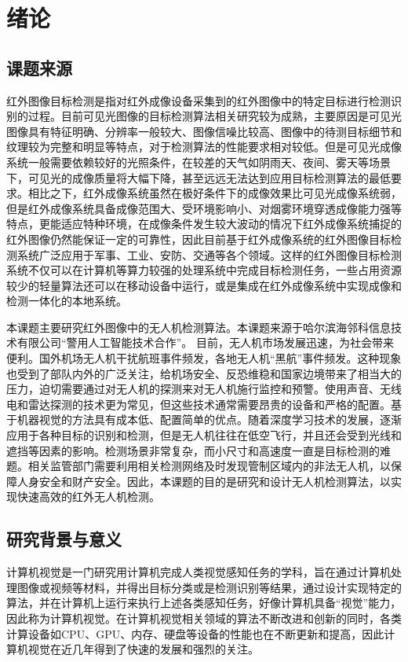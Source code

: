\chapter{绪论}

\section{课题来源}
红外图像目标检测是指对红外成像设备采集到的红外图像中的特定目标进行检测识别的过程。目前可见光图像的目标检测算法相关研究较为成熟，主要原因是可见光图像具有特征明确、分辨率一般较大、图像信噪比较高、图像中的待测目标细节和纹理较为完整和明显等特点，对于检测算法的性能要求相对较低。但是可见光成像系统一般需要依赖较好的光照条件，在较差的天气如阴雨天、夜间、雾天等场景下，可见光的成像质量将大幅下降，甚至远远无法达到应用目标检测算法的最低要求。相比之下，红外成像系统虽然在极好条件下的成像效果比可见光成像系统弱，但是红外成像系统具备成像范围大、受环境影响小、对烟雾环境穿透成像能力强等特点，更能适应特种环境，在成像条件发生较大波动的情况下红外成像系统捕捉的红外图像仍然能保证一定的可靠性，因此目前基于红外成像系统的红外图像目标检测系统广泛应用于军事、工业、安防、交通等各个领域。这样的红外图像目标检测系统不仅可以在计算机等算力较强的处理系统中完成目标检测任务，一些占用资源较少的轻量算法还可以在移动设备中运行，或是集成在红外成像系统中实现成像和检测一体化的本地系统。

本课题主要研究红外图像中的无人机检测算法。本课题来源于哈尔滨海邻科信息技术有限公司“警用人工智能技术合作”。
目前，无人机市场发展迅速，为社会带来便利。国外机场无人机干扰航班事件频发，各地无人机“黑航”事件频发。这种现象也受到了部队内外的广泛关注，给机场安全、反恐维稳和国家边境带来了相当大的压力，迫切需要通过对无人机的探测来对无人机施行监控和预警。使用声音、无线电和雷达探测的技术更为常见，但这些技术通常需要昂贵的设备和严格的配置。基于机器视觉的方法具有成本低、配置简单的优点。随着深度学习技术的发展，逐渐应用于各种目标的识别和检测，但是无人机往往在低空飞行，并且还会受到光线和遮挡等因素的影响。检测场景非常复杂，而小尺寸和高速度一直是目标检测的难题。相关监管部门需要利用相关检测网络及时发现管制区域内的非法无人机，以保障人身安全和财产安全。因此，本课题的目的是研究和设计无人机检测算法，以实现快速高效的红外无人机检测。

\section{研究背景与意义}
计算机视觉是一门研究用计算机完成人类视觉感知任务的学科，旨在通过计算机处理图像或视频等材料，并得出目标分类或是检测识别等结果，通过设计实现特定的算法，并在计算机上运行来执行上述各类感知任务，好像计算机具备“视觉”能力，因此称为计算机视觉。在计算机视觉相关领域的算法不断改进和创新的同时，各类计算设备如CPU、GPU、内存、硬盘等设备的性能也在不断更新和提高，因此计算机视觉在近几年得到了快速的发展和强烈的关注。


